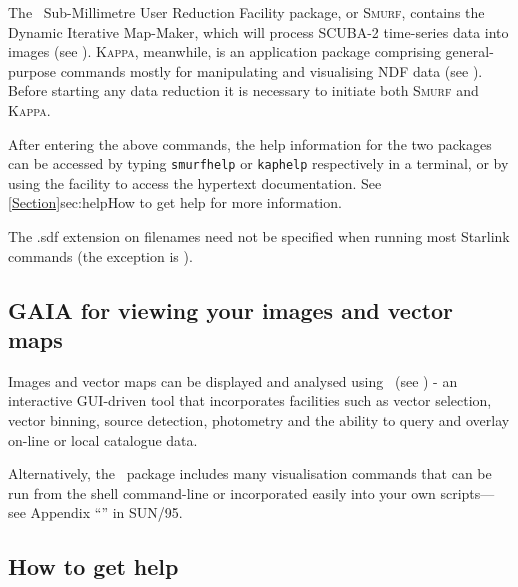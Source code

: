 The \starlink\ Sub-Millimetre User Reduction Facility package, or \textsc{Smurf},
contains the Dynamic Iterative Map-Maker, which will process
SCUBA-2 time-series data into images (see \smurfsun). \textsc{Kappa}, meanwhile, is
an application package comprising general-purpose commands mostly for
manipulating and visualising NDF data (see \kappasun). Before starting
any data reduction it is necessary to initiate both \textsc{Smurf} and
\textsc{Kappa}.

\begin{terminalv}
\end{terminalv}

After entering the above commands, the help information
for the two packages can be accessed by typing \texttt{smurfhelp} or
\texttt{kaphelp} respectively in a terminal, or by using the
 facility to access the hypertext documentation. See
\cref{Section}{sec:help}{How to get help} for more information.



\begin{tip}
The .sdf extension on filenames need not be specified when running most
Starlink commands (the exception is \picard).
\end{tip}


\subsection{GAIA for viewing your images and vector maps}
Images and vector maps can be displayed and analysed using \gaia\ (see
\gaiasun) - an interactive GUI-driven tool that incorporates facilities
such as vector selection, vector binning, source detection, photometry
and the ability to query and overlay on-line or local catalogue data.
\begin{terminalv}
\end{terminalv}

Alternatively, the \Kappa\ package includes many visualisation commands
that can be run from the shell command-line or incorporated easily into your
own scripts---see Appendix ``''
in SUN/95.


\subsection{How to get help}
\label{sec:help}

